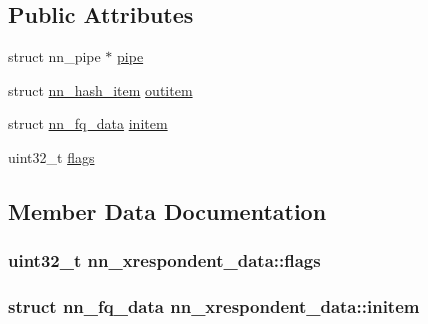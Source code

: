 \subsection*{Public Attributes}
\begin{DoxyCompactItemize}
\item 
struct nn\+\_\+pipe $\ast$ \hyperlink{structnn__xrespondent__data_add6861ce1f3977a99871f23d62851a10}{pipe}
\item 
struct \hyperlink{structnn__hash__item}{nn\+\_\+hash\+\_\+item} \hyperlink{structnn__xrespondent__data_a76ec23d34f74a173d721e768e0eb09e4}{outitem}
\item 
struct \hyperlink{structnn__fq__data}{nn\+\_\+fq\+\_\+data} \hyperlink{structnn__xrespondent__data_a3a7066223e2ee9d043ddfe3e14770f12}{initem}
\item 
uint32\+\_\+t \hyperlink{structnn__xrespondent__data_a5bed2560929e09672f4071d7430f1528}{flags}
\end{DoxyCompactItemize}


\subsection{Member Data Documentation}
\subsubsection[{flags}]{\setlength{\rightskip}{0pt plus 5cm}uint32\+\_\+t nn\+\_\+xrespondent\+\_\+data\+::flags}\hypertarget{structnn__xrespondent__data_a5bed2560929e09672f4071d7430f1528}{}\label{structnn__xrespondent__data_a5bed2560929e09672f4071d7430f1528}
\subsubsection[{initem}]{\setlength{\rightskip}{0pt plus 5cm}struct {\bf nn\+\_\+fq\+\_\+data} nn\+\_\+xrespondent\+\_\+data\+::initem}\hypertarget{structnn__xrespondent__data_a3a7066223e2ee9d043ddfe3e14770f12}{}\label{structnn__xrespondent__data_a3a7066223e2ee9d043ddfe3e14770f12}

